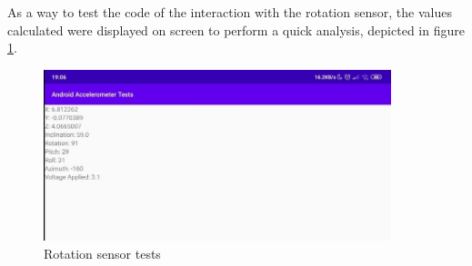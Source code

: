 %
As a way to test the code of the interaction with the rotation sensor, the values calculated were displayed on screen to perform a quick analysis, depicted in figure \ref{fig:rot-sens-test}.
%
\begin{figure}[!ht]
\centering
\includegraphics[width=0.9\textwidth]{img/rot-sensor-tests.png}
\caption{\label{fig:rot-sens-test}Rotation sensor tests}
\end{figure}
%
